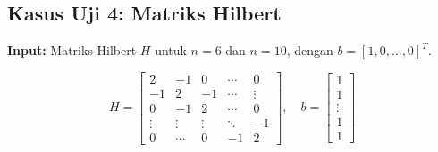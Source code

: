 \documentclass[12pt,a4paper]{report}
\begin{document}
\subsection{Kasus Uji 4: Matriks Hilbert}
\textbf{Input:} Matriks Hilbert $H$ untuk $n = 6$ dan $n = 10$, dengan $b = [1, 0, \dots, 0]^T$.
 
\[
H = \begin{bmatrix}
    2 & -1 & 0 & \cdots & 0 \\
    -1 & 2 & -1 & \cdots & \vdots \\
    0 & -1 & 2 & \cdots & 0 \\
    \vdots & \vdots & \vdots & \ddots & -1 \\
    0 & \cdots & 0 & -1 & 2
\end{bmatrix},
\quad
b = \begin{bmatrix} 1 \\1 \\ \vdots \\ 1 \\ 1 \end{bmatrix}
\]
 
\end{document}
